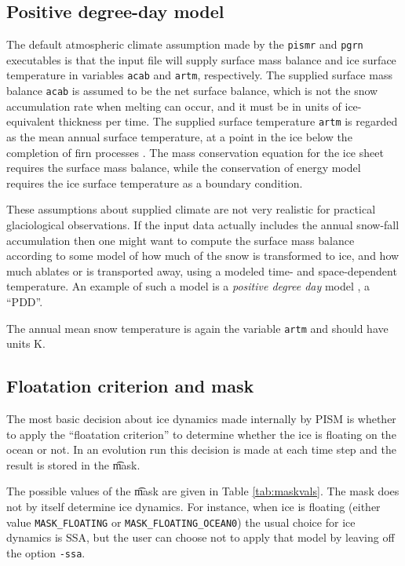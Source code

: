 \subsection{Positive degree-day model}  \label{subsect:pdd}     The default atmospheric climate assumption made by the \verb|pismr| and \verb|pgrn| executables is that the input file will supply surface mass balance and ice surface temperature in variables \verb|acab| and \verb|artm|, respectively.  The supplied surface mass balance \verb|acab| is assumed to be the net surface balance, which is not the snow accumulation rate when melting can occur, and it must be in units of ice-equivalent thickness per time.  The supplied surface temperature \verb|artm| is regarded as the mean annual surface temperature, at a point in the ice below the completion of firn processes \cite{Hock05}.  The mass conservation equation for the ice sheet requires the surface mass balance, while the conservation of energy model requires the ice surface temperature as a boundary condition.

These assumptions about supplied climate are not very realistic for practical glaciological observations.  If the input data actually includes the annual snow-fall accumulation then one might want to compute the surface mass balance according to some model of how much of the snow is transformed to ice, and how much ablates or is transported away, using a modeled time- and space-dependent temperature.  An example of such a model is a \emph{positive degree day} model \cite{Hock05}, a ``PDD''.  

 The annual mean snow temperature is again the variable \verb|artm| and should have units K.



\subsection{Floatation criterion and mask} \label{subsect:floatmask}  The most basic decision about ice dynamics made internally by PISM is whether to apply the ``floatation criterion'' to determine whether the ice is floating on the ocean or not.  In an evolution run this decision is made at each time step and the result is stored in the \t{mask}.

The possible values of the \t{mask} are given in Table \ref{tab:maskvals}.  The mask does not by itself determine ice dynamics.  For instance, when ice is floating (either value \verb|MASK_FLOATING| or \verb|MASK_FLOATING_OCEAN0|) the usual choice for ice dynamics is SSA, but the user can choose not to apply that model by leaving off the option \verb|-ssa|.

